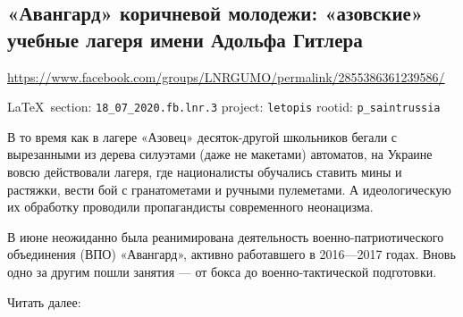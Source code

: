  
 
\subsection{«Авангард» коричневой молодежи: «азовские» учебные лагеря имени Адольфа Гитлера}
\url{https://www.facebook.com/groups/LNRGUMO/permalink/2855386361239586/}
  
\vspace{0.5cm}
{\small\LaTeX~section: \verb|18_07_2020.fb.lnr.3| project: \verb|letopis| rootid: \verb|p_saintrussia|}
\vspace{0.5cm}
 
В то время как в лагере «Азовец» десяток-другой школьников бегали с вырезанными
из дерева силуэтами (даже не макетами) автоматов, на Украине вовсю действовали
лагеря, где националисты обучались ставить мины и растяжки, вести бой с
гранатометами и ручными пулеметами.  А идеологическую их обработку проводили
пропагандисты современного неонацизма.

В июне неожиданно была реанимирована деятельность военно-патриотического
объединения (ВПО) «Авангард», активно работавшего в 2016—2017 годах.  Вновь
одно за другим пошли занятия — от бокса до военно-тактической подготовки.

Читать далее: 
